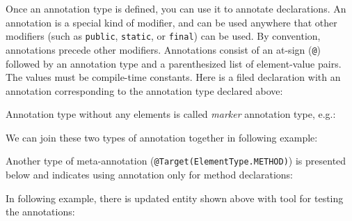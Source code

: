 \documentclass[11pt,twoside,a4paper]{book}
\begin{document}
Once an annotation type is defined, you can use it to annotate declarations. An
annotation is a special kind of modifier, and can be used anywhere that other
modifiers (such as \verb|public|, \verb|static|, or \verb|final|) can be used.
By convention, annotations precede other modifiers. Annotations consist of an at-sign
(\verb|@|) followed by an annotation type and a parenthesized list of
element-value pairs. The values must be compile-time constants. Here is a filed
declaration with an annotation corresponding to the annotation type declared above:



Annotation type without any elements is called \textit{marker}
annotation type, e.g.:



We can join these two types of annotation together in following example:



Another type of meta-annotation
(\verb|@Target(ElementType.METHOD)|) is presented below and indicates using
annotation only for method declarations:



In following example, there is updated entity shown above with tool for testing
the annotations:


\newpage




%

\end{document}
